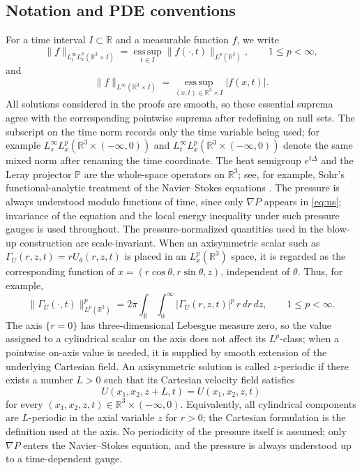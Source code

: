 \documentclass[11pt]{amsart}
\theoremstyle{plain}
\theoremstyle{definition}
\theoremstyle{remark}
\numberwithin{equation}{section}
\begin{document}
\subsection{Notation and PDE conventions}

For a time interval \(I\subset\mathbb R\) and a measurable function \(f\), we
write
\[
   \|f\|_{L_t^\infty L_x^p(\mathbb R^3\times I)}
   =
   \operatorname*{ess\,sup}_{t\in I}
   \|f(\cdot,t)\|_{L^p(\mathbb R^3)},\qquad 1\le p<\infty ,
\]
and
\[
   \|f\|_{L^\infty(\mathbb R^3\times I)}
   =
   \operatorname*{ess\,sup}_{(x,t)\in\mathbb R^3\times I}|f(x,t)|.
\]
All solutions considered in the proofs are smooth, so these essential suprema
agree with the corresponding pointwise suprema after redefining on null sets.
The subscript on the time norm records only the time variable being used; for
example \(L_s^\infty L_x^p(\mathbb R^3\times(-\infty,0))\) and
\(L_t^\infty L_x^p(\mathbb R^3\times(-\infty,0))\) denote the same mixed
norm after renaming the time coordinate.
The heat semigroup \(e^{t\Delta}\) and the Leray projector \(\mathbb P\) are
the whole-space operators on \(\mathbb R^3\); see, for example, Sohr's
functional-analytic treatment of the Navier--Stokes equations \cite{Sohr2001}.
The pressure is always understood modulo functions of time, since only
\(\nabla P\) appears in \eqref{eq:ns}; invariance of the equation and the
local energy inequality under such pressure gauges is used throughout.  The
pressure-normalized quantities used in the blow-up construction are
scale-invariant.
When an axisymmetric scalar such as
\(\Gamma_U(r,z,t)=rU_\theta(r,z,t)\) is placed in an \(L^p_x(\mathbb R^3)\)
space, it is regarded as the corresponding function of
\(x=(r\cos\theta,r\sin\theta,z)\), independent of \(\theta\).  Thus, for
example,
\[
   \|\Gamma_U(\cdot,t)\|_{L^p(\mathbb R^3)}^p
   =
   2\pi\int_{\mathbb R}\int_0^\infty
      |\Gamma_U(r,z,t)|^p\,r\,dr\,dz,
   \qquad 1\le p<\infty .
\]
The axis \(\{r=0\}\) has three-dimensional Lebesgue measure zero, so the value
assigned to a cylindrical scalar on the axis does not affect its \(L^p\)-class;
when a pointwise on-axis value is needed, it is supplied by smooth extension of
the underlying Cartesian field.
An axisymmetric solution is called \(z\)-periodic if there exists a number
\(L>0\) such that its Cartesian velocity field satisfies
\[
   U(x_1,x_2,z+L,t)=U(x_1,x_2,z,t)
\]
for every \((x_1,x_2,z,t)\in\mathbb R^3\times(-\infty,0)\).  Equivalently,
all cylindrical components are \(L\)-periodic in the axial variable \(z\) for
\(r>0\); the Cartesian formulation is the definition used at the axis.  No
periodicity of the pressure itself is assumed; only \(\nabla P\) enters the
Navier--Stokes equation, and the pressure is always understood up to a
time-dependent gauge.
\end{document}
